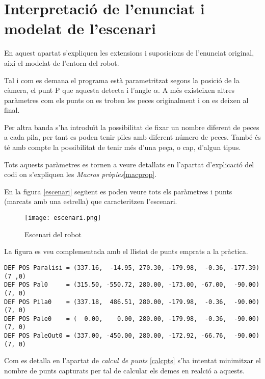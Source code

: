 \section{Interpretació de l'enunciat i modelat de l'escenari}
En aquest apartat s'expliquen les extensions i suposicions de l'enunciat original,
així el modelat de l'entorn del robot.

Tal i com es demana el programa està parametritzat segons la posició de la càmera,
el punt P que aquesta detecta i l'angle $\alpha$. A més existeixen altres paràmetres
com els punts on es troben les peces originalment i on es deixen al final.

Per altra banda s'ha introduït la possibilitat de fixar un nombre diferent de peces
a cada pila, per tant es poden tenir piles amb diferent número de peces. També
és té amb compte la possibilitat de tenir més d'una peça, o cap, d'algun tipus.

Tots aquests paràmetres es tornen a veure detallats en l'apartat d'explicació del
codi on s'expliquen les \emph{Macros pròpies}\ref{macprop}.

En la figura \ref{escenari} següent es poden veure tots els paràmetres i punts
(marcats amb una estrella) que caracteritzen l'escenari.

\begin{figure}[H]
\begin{center}\label{fig:escenari}
 \texttt{[image: escenari.png]}
\end{center}
  \caption{Escenari del robot}
\end{figure}

La figura es veu complementada amb el llistat de punts emprats a la pràctica.

\begin{verbatim}
DEF POS Paralisi = (337.16,  -14.95, 270.30, -179.98,  -0.36, -177.39)(7 ,0)
DEF POS Pal0     = (315.50, -550.72, 280.00, -173.00, -67.00,  -90.00)(7, 0)
DEF POS Pila0    = (337.18,  486.51, 280.00, -179.98,  -0.36,  -90.00)(7, 0)
DEF POS Pale0    = (  0.00,    0.00, 280.00, -179.98,  -0.36,  -90.00)(7, 0)
DEF POS PaleOut0 = (337.00, -450.00, 280.00, -172.92, -66.76,  -90.00)(7, 0)
\end{verbatim}

Com es detalla en l'apartat de \emph{calcul de punts} \ref{calcpts}
s'ha intentat minimitzar el nombre de punts capturats per tal
de calcular els demes en realció a aquests.

